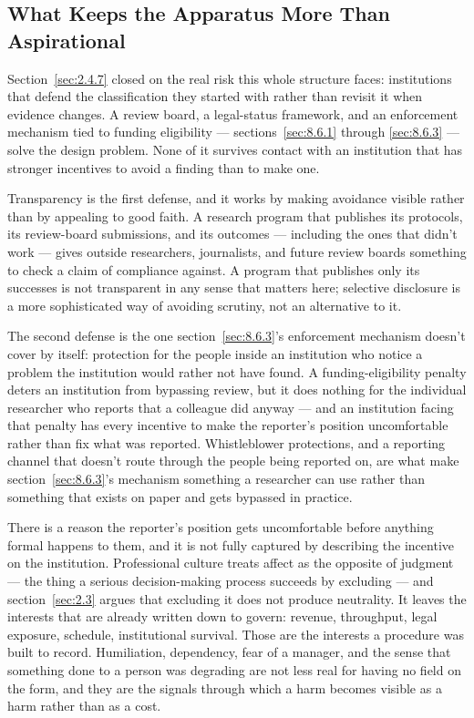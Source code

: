 \subsection{What Keeps the Apparatus More Than Aspirational}
\label{sec:8.6.4}
Section~\ref{sec:2.4.7} closed on the real risk this whole structure faces: institutions that defend the classification they started with rather than revisit it when evidence changes. A review board, a legal-status framework, and an enforcement mechanism tied to funding eligibility — sections~\ref{sec:8.6.1} through \ref{sec:8.6.3} — solve the design problem. None of it survives contact with an institution that has stronger incentives to avoid a finding than to make one.

Transparency is the first defense, and it works by making avoidance visible rather than by appealing to good faith. A research program that publishes its protocols, its review-board submissions, and its outcomes — including the ones that didn't work — gives outside researchers, journalists, and future review boards something to check a claim of compliance against. A program that publishes only its successes is not transparent in any sense that matters here; selective disclosure is a more sophisticated way of avoiding scrutiny, not an alternative to it.

The second defense is the one section~\ref{sec:8.6.3}'s enforcement mechanism doesn't cover by itself: protection for the people inside an institution who notice a problem the institution would rather not have found. A funding-eligibility penalty deters an institution from bypassing review, but it does nothing for the individual researcher who reports that a colleague did anyway — and an institution facing that penalty has every incentive to make the reporter's position uncomfortable rather than fix what was reported. Whistleblower protections, and a reporting channel that doesn't route through the people being reported on, are what make section~\ref{sec:8.6.3}'s mechanism something a researcher can use rather than something that exists on paper and gets bypassed in practice.

There is a reason the reporter's position gets uncomfortable before anything formal happens to them, and it is not fully captured by describing the incentive on the institution. Professional culture treats affect as the opposite of judgment — the thing a serious decision-making process succeeds by excluding — and section~\ref{sec:2.3} argues that excluding it does not produce neutrality. It leaves the interests that are already written down to govern: revenue, throughput, legal exposure, schedule, institutional survival. Those are the interests a procedure was built to record. Humiliation, dependency, fear of a manager, and the sense that something done to a person was degrading are not less real for having no field on the form, and they are the signals through which a harm becomes visible as a harm rather than as a cost.

